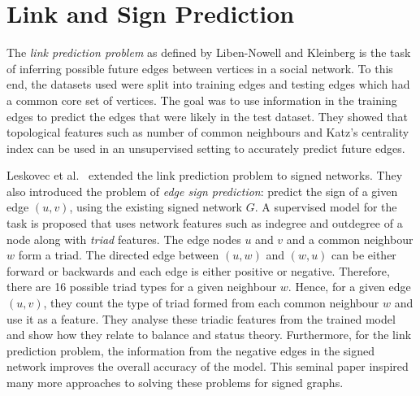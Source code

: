 \section{Link and Sign Prediction}
\label{sec:link-prediction}
The \textit{link prediction problem} as defined by Liben-Nowell and Kleinberg \cite{liben-nowell2007the} is the task of inferring possible future edges between vertices in a social network.
To this end, the datasets used were split into training edges and testing edges which had a common core set of vertices.
The goal was to use information in the training edges to predict the edges that were likely in the test dataset.
They showed that topological features such as number of common neighbours and Katz's centrality index can be used in an unsupervised setting to accurately predict future edges.

Leskovec et al.\ \cite{leskovec2010predicting} extended the link prediction problem to signed networks.
They also introduced the problem of \textit{edge sign prediction}: predict the sign of a given edge $(u,v)$, using the existing signed network $G$.
A supervised model for the task is proposed that uses network features such as indegree and outdegree of a node along with \textit{triad} features.
The edge nodes $u$ and $v$ and a common neighbour $w$ form a triad.
The directed edge between $(u,w)$ and $(w,u)$ can be either forward or backwards and each edge is either positive or negative.
Therefore, there are 16 possible triad types for a given neighbour $w$.
Hence, for a given edge $(u,v)$, they count the type of triad formed from each common neighbour $w$ and use it as a feature.
They analyse these triadic features from the trained model and show how they relate to balance and status theory.
Furthermore, for the link prediction problem, the information from the negative edges in the signed network improves the overall accuracy of the model.
This seminal paper inspired many more approaches to solving these problems for signed graphs.   

